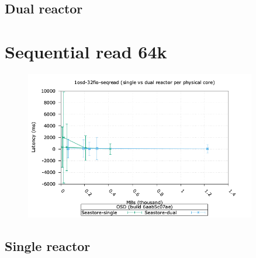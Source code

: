 \subsection{Dual reactor}

\pagebreak

\section{Sequential read 64k}

\begin{figure}[ht]
  \centering
  \includegraphics[width=0.9\textwidth]{seastore_1osd_32fio_seqread_iops_vs_lat.png}
\end{figure}

%
\subsection{Single reactor}

